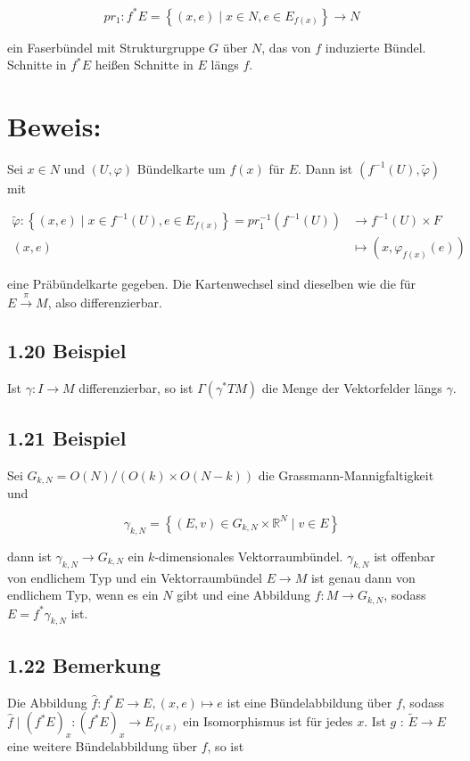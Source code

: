 \documentclass[10pt, letterpaper]{article}
\begin{document}
$$
p r_{1}: f^{*} E=\left\{(x, e) \mid x \in N, e \in E_{f(x)}\right\} \rightarrow N
$$

ein Faserbündel mit Strukturgruppe $G$ über $N$, das von $f$ induzierte Bündel. Schnitte in $f^{*} E$ heißen Schnitte in $E$ längs $f$.

\section*{Beweis:}
Sei $x \in N$ und $(U, \varphi)$ Bündelkarte um $f(x)$ für $E$. Dann ist $\left(f^{-1}(U), \tilde{\varphi}\right)$ mit

$$
\begin{aligned}
\tilde{\varphi}:\left\{(x, e) \mid x \in f^{-1}(U), e \in E_{f(x)}\right\}=p r_{1}^{-1}\left(f^{-1}(U)\right) & \longrightarrow f^{-1}(U) \times F \\
(x, e) & \mapsto\left(x, \varphi_{f(x)}(e)\right)
\end{aligned}
$$

eine Präbündelkarte gegeben. Die Kartenwechsel sind dieselben wie die für $E \xrightarrow{\pi} M$, also differenzierbar.

\subsection*{1.20 Beispiel}
Ist $\gamma: I \rightarrow M$ differenzierbar, so ist $\Gamma\left(\gamma^{*} T M\right)$ die Menge der Vektorfelder längs $\gamma$.

\subsection*{1.21 Beispiel}
Sei $G_{k, N}=O(N) /(O(k) \times O(N-k))$ die Grassmann-Mannigfaltigkeit und

$$
\gamma_{k, N}=\left\{(E, v) \in G_{k, N} \times \mathbb{R}^{N} \mid v \in E\right\}
$$

dann ist $\gamma_{k, N} \rightarrow G_{k, N}$ ein $k$-dimensionales Vektorraumbündel. $\gamma_{k, N}$ ist offenbar von endlichem Typ und ein Vektorraumbündel $E \rightarrow M$ ist genau dann von endlichem Typ, wenn es ein $N$ gibt und eine Abbildung $f: M \rightarrow G_{k, N}$, sodass $E=f^{*} \gamma_{k, N}$ ist.

\subsection*{1.22 Bemerkung}
Die Abbildung $\hat{f}: f^{*} E \rightarrow E,(x, e) \mapsto e$ ist eine Bündelabbildung über $f$, sodass $\hat{f} \mid\left(f^{*} E\right)_{x}:\left(f^{*} E\right)_{x} \rightarrow E_{f(x)}$ ein Isomorphismus ist für jedes $x$. Ist $g$ : $\widetilde{E} \rightarrow E$ eine weitere Bündelabbildung über $f$, so ist
\end{document}

